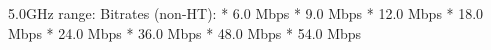 5.0GHz range:
		Bitrates (non-HT):
			* 6.0 Mbps
			* 9.0 Mbps
			* 12.0 Mbps
			* 18.0 Mbps
			* 24.0 Mbps
			* 36.0 Mbps
			* 48.0 Mbps
			* 54.0 Mbps

